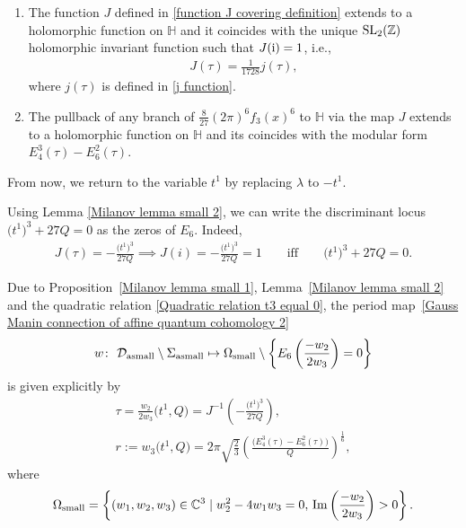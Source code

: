 \begin{Lemma}\label{Milanov lemma small 2}\quad
\begin{enumerate}\itemsep=0pt

\item[$(1)$]
The function $J$ defined in \eqref{function J covering definition} extends to a holomorphic function on $\mathbb{H}$ and it coincides with the unique ${\rm SL}_2(\mathbb{Z})$ holomorphic invariant function such that $J({\rm i})=1$, i.e.,
\begin{gather}\label{J function other normalization}
J(\tau)=\frac{1}{1728}j(\tau),
\end{gather}
where $j(\tau)$ is defined in \eqref{j function}.
\item[$(2)$]
The pullback of any branch of $\frac{8}{27}(2\pi)^6f_3(x)^{6}$ to $\mathbb{H}$ via the map $J$ extends to a holomorphic function on $\mathbb{H}$ and its coincides with the modular form $E_4^3(\tau)-E_6^2(\tau)$.
\end{enumerate}

\end{Lemma}
From now, we return to the variable $t^1$ by replacing $\lambda$ to $-t^1$.

Using Lemma \ref{Milanov lemma small 2}, we can write the discriminant locus $\bigl(t^1\bigr)^3+27Q=0$ as the zeros of $E_6$. Indeed,
\begin{gather*}
J(\tau)=-\frac{\bigl(t^1\bigr)^3}{27Q} \implies J(i)=-\frac{\bigl(t^1\bigr)^3}{27Q}=1 \qquad \text{iff} \qquad \bigl(t^1\bigr)^3+27Q=0.
\end{gather*}

Due to Proposition~\ref{Milanov lemma small 1}, Lemma~\ref{Milanov lemma small 2} and the quadratic relation \eqref{Quadratic relation t3 equal 0}, the period map~\eqref{Gauss Manin connection of affine quantum cohomology 2}
\begin{gather*}
w\colon\ \mathcal{D}_{\rm asmall}\setminus{\Sigma_{\rm asmall}}\mapsto \Omega_{\rm small}\setminus\left\{ E_6\left(\frac{-w_2}{2w_3}\right)=0\right\}
\end{gather*}
 is given explicitly by
\begin{gather}
\tau=\frac{w_2}{2w_3}\bigl(t^1,Q\bigr)=J^{-1}\left( -\frac{\bigl(t^1\bigr)^3}{27Q} \right),\nonumber\\
r:=w_3\bigl(t^1,Q\bigr)=2\pi\sqrt{\frac{2}{3}}\left(\frac{\bigl(E_4^3(\tau)-E_6^2(\tau) \bigr)}{Q}\right)^{\frac{1}{6}},\label{period map functions}
\end{gather}
where
\[%
\Omega_{\rm small}=\left\{ (w_1,w_2,w_3) \in \mathbb{C}^3 \mid w_2^2-4w_1w_3=0,\, \operatorname{Im}\left(\frac{-w_2}{2w_3}\right)> 0\right\}.
\]

